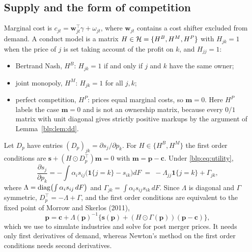 \subsection{Supply and the form of competition}
Marginal cost is $c_{jt} = \bm w_{jt}^\top\gamma + \omega_{jt}$, where $\bm w_{jt}$ contains a
cost shifter excluded from demand. A conduct model is a matrix $H\in\mathcal{H} = \{H^{B}, H^{M}, H^{P}\}$
with $H_{jk}=1$ when the price of $j$ is set taking account of the profit on $k$, and $H_{jj}=1$:
\begin{itemize}
\item Bertrand Nash, $H^B$: $H_{jk} = 1$ if and only if $j$ and $k$ have the same owner;
\item joint monopoly, $H^M$: $H_{jk}=1$ for all $j,k$;
\item perfect competition, $H^P$: prices equal marginal costs, so $\bm m = 0$. Here $H^P$ labels the case $\bm m = 0$ and is not an ownership matrix, because every $0/1$ matrix with unit diagonal gives strictly positive markups by the argument of Lemma~\ref{blp:lem:dd}.
\end{itemize}
Let $D_p$ have entries $(D_p)_{jk} = \partial s_j/\partial p_k$. For $H\in\{H^B,H^M\}$ the first
order conditions are $\bm s + (H\odot D_p^\top)\bm m = 0$ with $\bm m = \bm p - \bm c$. Under
\eqref{blp:eq:utility},
\begin{equation}\label{blp:eq:jacobian}
  \frac{\partial s_j}{\partial p_k} = -\int \alpha_i s_{ij}\bigl(\mathbf 1\{j=k\} - s_{ik}\bigr)dF
  \;=\; -\Lambda_{jj}\mathbf 1\{j=k\} + \Gamma_{jk},
\end{equation}
where $\Lambda = \mathrm{diag}\bigl(\int\alpha_i s_{ij}\,dF\bigr)$ and $\Gamma_{jk} = \int\alpha_i s_{ij}s_{ik}\,dF$.
Since $\Lambda$ is diagonal and $\Gamma$ symmetric, $D_p^\top = -\Lambda + \Gamma$, and the first
order conditions are equivalent to the fixed point of Morrow and Skerlos (2011),
\begin{equation}\label{blp:eq:zeta}
\bm p = \bm c + \Lambda(\bm p)^{-1}\bigl\{\bm s(\bm p) + (H\odot\Gamma(\bm p))(\bm p-\bm c)\bigr\},
\end{equation}
which we use to simulate industries and solve for post merger prices. It needs only first derivatives of demand, whereas Newton's method on the first order conditions needs second derivatives.

